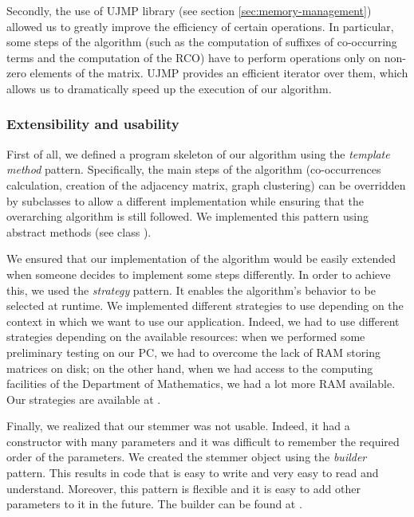             Secondly, the use of UJMP library (see section \ref{sec:memory-management}) allowed us to greatly improve the efficiency of certain operations. In particular, some steps of the algorithm (such as the computation of suffixes of co-occurring terms and the computation of the RCO) have to perform operations only on non-zero elements of the matrix. UJMP provides an efficient iterator over them, which allows us to dramatically speed up the execution of our algorithm.

        \subsubsection{Extensibility and usability}
            First of all, we defined a program skeleton of our algorithm using the \emph{template method} pattern. Specifically, the main steps of the algorithm (co-occurrences calculation, creation of the adjacency matrix, graph clustering) can be overridden by subclasses to allow a different implementation while ensuring that the overarching algorithm is still followed. We implemented this pattern using abstract methods (see class ).

            We ensured that our implementation of the algorithm would be easily extended when someone decides to implement some steps differently.
            In order to achieve this, we used the \emph{strategy} pattern. It enables the algorithm's behavior to be selected at runtime. We implemented different strategies to use depending on the context in which we want to use our application. Indeed, we had to use different strategies depending on the available resources: when we performed some preliminary testing on our PC, we had to overcome the lack of RAM storing matrices on disk; on the other hand, when we had access to the computing facilities of the Department of Mathematics\footnotemark{}, we had a lot more RAM available. Our strategies are available at .
            
            Finally, we realized that our stemmer was not usable. Indeed, it had a constructor with many parameters and it was difficult to remember the required order of the parameters. We created the stemmer object using the \emph{builder} pattern. This results in code that is easy to write and very easy to read and understand. Moreover, this pattern is flexible and it is easy to add other parameters to it in the future. The builder can be found at .

